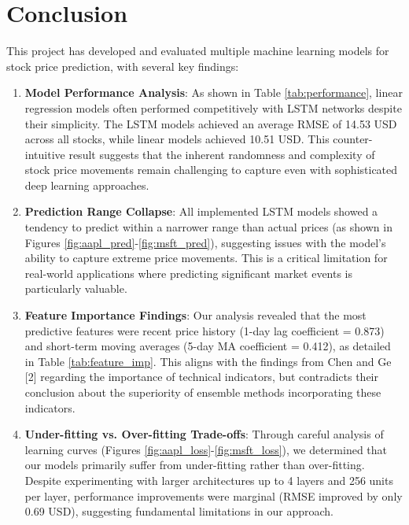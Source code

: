 \documentclass[sigconf]{acmart}
\begin{document}
\section{Conclusion}

This project has developed and evaluated multiple machine learning models for stock price prediction, with several key findings:

\begin{enumerate}
\item \textbf{Model Performance Analysis}: As shown in Table \ref{tab:performance}, linear regression models often performed competitively with LSTM networks despite their simplicity. The LSTM models achieved an average RMSE of 14.53 USD across all stocks, while linear models achieved 10.51 USD. This counter-intuitive result suggests that the inherent randomness and complexity of stock price movements remain challenging to capture even with sophisticated deep learning approaches.

\item \textbf{Prediction Range Collapse}: All implemented LSTM models showed a tendency to predict within a narrower range than actual prices (as shown in Figures \ref{fig:aapl_pred}-\ref{fig:msft_pred}), suggesting issues with the model's ability to capture extreme price movements. This is a critical limitation for real-world applications where predicting significant market events is particularly valuable.

\item \textbf{Feature Importance Findings}: Our analysis revealed that the most predictive features were recent price history (1-day lag coefficient = 0.873) and short-term moving averages (5-day MA coefficient = 0.412), as detailed in Table \ref{tab:feature_imp}. This aligns with the findings from Chen and Ge [2] regarding the importance of technical indicators, but contradicts their conclusion about the superiority of ensemble methods incorporating these indicators.

\item \textbf{Under-fitting vs. Over-fitting Trade-offs}: Through careful analysis of learning curves (Figures \ref{fig:aapl_loss}-\ref{fig:msft_loss}), we determined that our models primarily suffer from under-fitting rather than over-fitting. Despite experimenting with larger architectures up to 4 layers and 256 units per layer, performance improvements were marginal (RMSE improved by only 0.69 USD), suggesting fundamental limitations in our approach.


\end{enumerate}
\end{document}
